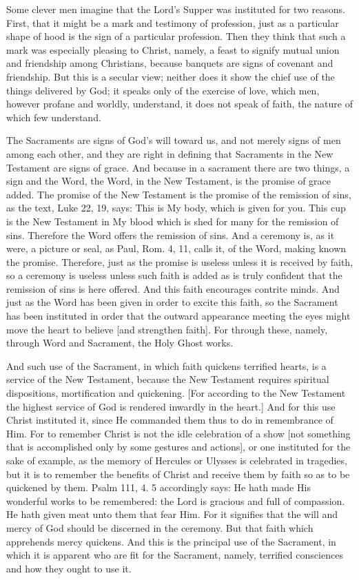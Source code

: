 Some clever men imagine that the Lord's Supper was instituted for two
reasons.  First, that it might be a mark and testimony of profession,
just as a particular shape of hood is the sign of a particular
profession.  Then they think that such a mark was especially pleasing
to Christ, namely, a feast to signify mutual union and friendship
among Christians, because banquets are signs of covenant and
friendship.  But this is a secular view; neither does it show the
chief use of the things delivered by God; it speaks only of the
exercise of love, which men, however profane and worldly, understand,
it does not speak of faith, the nature of which few understand.

The Sacraments are signs of God's will toward us, and not merely
signs of men among each other, and they are right in defining that
Sacraments in the New Testament are signs of grace.  And because in a
sacrament there are two things, a sign and the Word, the Word, in the
New Testament, is the promise of grace added.  The promise of the New
Testament is the promise of the remission of sins, as the text, Luke
22, 19, says: This is My body, which is given for you.  This cup is
the New Testament in My blood which is shed for many for the
remission of sins.  Therefore the Word offers the remission of sins.
And a ceremony is, as it were, a picture or seal, as Paul, Rom. 4, 11,
calls it, of the Word, making known the promise.  Therefore, just as
the promise is useless unless it is received by faith, so a ceremony
is useless unless such faith is added as is truly confident that the
remission of sins is here offered.  And this faith encourages
contrite minds.  And just as the Word has been given in order to
excite this faith, so the Sacrament has been instituted in order that
the outward appearance meeting the eyes might move the heart to
believe [and strengthen faith].  For through these, namely, through
Word and Sacrament, the Holy Ghost works.

And such use of the Sacrament, in which faith quickens terrified
hearts, is a service of the New Testament, because the New Testament
requires spiritual dispositions, mortification and quickening.  [For
according to the New Testament the highest service of God is rendered
inwardly in the heart.] And for this use Christ instituted it, since
He commanded them thus to do in remembrance of Him.  For to remember
Christ is not the idle celebration of a show [not something that is
accomplished only by some gestures and actions], or one instituted
for the sake of example, as the memory of Hercules or Ulysses is
celebrated in tragedies, but it is to remember the benefits of Christ
and receive them by faith so as to be quickened by them.  Psalm 111,
4. 5 accordingly says: He hath made His wonderful works to be
remembered: the Lord is gracious and full of compassion.  He hath
given meat unto them that fear Him.  For it signifies that the will
and mercy of God should be discerned in the ceremony.  But that faith
which apprehends mercy quickens.  And this is the principal use of
the Sacrament, in which it is apparent who are fit for the Sacrament,
namely, terrified consciences and how they ought to use it.

